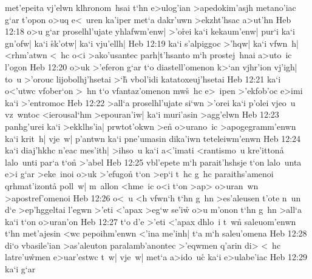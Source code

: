 met'epeita
vj'elwn
klhronom~hsai
t`hn
e>ulog'ian
>apedokim'asjh
metano'iac
g`ar
t'opon
o>uq
e<~uren
ka'iper
met`a
dakr'uwn
>ekzht'hsac
a>ut'hn\bibvsend
\vs Heb 12:18
o>u
g`ar
proselhl'ujate
yhlafwm'enw|
>'o\r{r}ei
ka`i
kekaum'enw|
pur`i
ka`i
gn'ofw|
ka`i
\r{s}k'otw|
ka`i
vju'ellh|\bibvsend
\vs Heb 12:19
ka`i
s'alpiggoc
>'hqw|
ka`i
vfwn~h|
<rhm'atwn
<~hc
o<i
>ako'usantec
parh|t'hsanto
m`h
prostej~hnai
a>uto~ic
l'ogon\bibvsend
\vs Heb 12:20
o>uk
>'eferon
g`ar
t`o
diastell'omenon
k>`an
vjhr'ion
vj'igh|
to~u
>'orouc
lijobolhj'hsetai
>`h\r{}
vbol'idi
katatoxeuj'hsetai\bibvsend
\vs Heb 12:21
ka`i
o<'utwc
vfober`on
>~hn
t`o
vfantaz'omenon
mw\r{s}~hc
e>~ipen
>'ekfob'oc
e>imi
ka`i
>'entromoc\bibvsend
\vs Heb 12:22
>all`a
proselhl'ujate
si`wn
>'orei
ka`i
p'olei
vjeo~u
vz~wntoc
<ierousal`hm
>epouran'iw|
ka`i
muri'asin
>agg'elwn\bibvsend
\vs Heb 12:23
panhg'urei
ka`i
>ekklhs'ia|
prwtot'okwn
>en\r{}
o>urano~ic
>apogegramm'enwn
ka`i
krit~h|
vje~w|
p'antwn
ka`i
pne'umasin
dika'iwn
teteleiwm'enwn\bibvsend
\vs Heb 12:24
ka`i
diaj'hkhc
n'eac
mes'ith|
>ihso~u
ka`i
a<'imati
<rantismo~u
kre'itton\r{a}
lalo~unti
par`a
t`o\r{n}
>'abel\bibvsend
\vs Heb 12:25
vbl'epete
m`h
parait'hshsje
t`on
lalo~unta
e>i
g`ar
>eke~inoi
o>uk
>'efugon\r{}
t`on
>ep`i
t~hc
g~hc
paraiths'amenoi
qrhmat'izonta\r{}
poll~w|
m~allon
<hme~ic
o<i
t`on
>ap>
o>uran~wn
>apostref'omenoi\bibvsend
\vs Heb 12:26
o<~u
<h
vfwn`h
t`hn
g~hn
>es'aleusen
t'ote
n~un
d`e
>ep'hggeltai
l'egwn
>'eti
<'apax
>eg`w
se'i\r{w}
o>u
m'onon
t`hn
g~hn
>all`a
ka`i
t`on
o>uran'on\bibvsend
\vs Heb 12:27
t`o
d'e
>'eti
<'apax
dhlo~i
t~wn\r{}
saleuom'enwn
t`hn
met'ajesin
<wc
pepoihm'enwn
<'ina
me'inh|
t`a
m`h
saleu'omena\bibvsend
\vs Heb 12:28
di`o
vbasile'ian
>as'aleuton
paralamb'anontec
>'eqwmen
q'arin
di>
<~hc
latre'u\r{w}men
e>uar'estwc
t~w|
vje~w|
met`a
a>ido~uc\r{}
ka`i
e>ulabe'iac\bibvsend
\vs Heb 12:29
ka`i
g`ar
